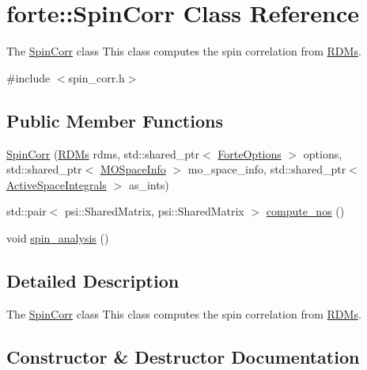 \hypertarget{classforte_1_1_spin_corr}{}\section{forte\+:\+:Spin\+Corr Class Reference}
\label{classforte_1_1_spin_corr}


The \mbox{\hyperlink{classforte_1_1_spin_corr}{Spin\+Corr}} class This class computes the spin correlation from \mbox{\hyperlink{classforte_1_1_r_d_ms}{R\+D\+Ms}}.  




{\ttfamily \#include $<$spin\+\_\+corr.\+h$>$}

\subsection*{Public Member Functions}
\begin{DoxyCompactItemize}
\item 
\mbox{\hyperlink{classforte_1_1_spin_corr_ae4cb9ec9d20c9d1ad430c816e6870e4f}{Spin\+Corr}} (\mbox{\hyperlink{classforte_1_1_r_d_ms}{R\+D\+Ms}} rdms, std\+::shared\+\_\+ptr$<$ \mbox{\hyperlink{classforte_1_1_forte_options}{Forte\+Options}} $>$ options, std\+::shared\+\_\+ptr$<$ \mbox{\hyperlink{classforte_1_1_m_o_space_info}{M\+O\+Space\+Info}} $>$ mo\+\_\+space\+\_\+info, std\+::shared\+\_\+ptr$<$ \mbox{\hyperlink{classforte_1_1_active_space_integrals}{Active\+Space\+Integrals}} $>$ as\+\_\+ints)
\item 
std\+::pair$<$ psi\+::\+Shared\+Matrix, psi\+::\+Shared\+Matrix $>$ \mbox{\hyperlink{classforte_1_1_spin_corr_a7394e555fba8cf3dabeff5c187047cb9}{compute\+\_\+nos}} ()
\item 
void \mbox{\hyperlink{classforte_1_1_spin_corr_ad68819dec9a0cb635550b3d6f90dd5ee}{spin\+\_\+analysis}} ()
\end{DoxyCompactItemize}


\subsection{Detailed Description}
The \mbox{\hyperlink{classforte_1_1_spin_corr}{Spin\+Corr}} class This class computes the spin correlation from \mbox{\hyperlink{classforte_1_1_r_d_ms}{R\+D\+Ms}}. 

\subsection{Constructor \& Destructor Documentation}
\mbox{\label{classforte_1_1_spin_corr_ae4cb9ec9d20c9d1ad430c816e6870e4f}} 
